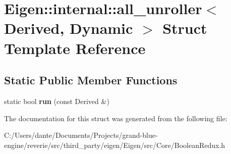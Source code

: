 \hypertarget{struct_eigen_1_1internal_1_1all__unroller_3_01_derived_00_01_dynamic_01_4}{}\section{Eigen\+::internal\+::all\+\_\+unroller$<$ Derived, Dynamic $>$ Struct Template Reference}
\label{struct_eigen_1_1internal_1_1all__unroller_3_01_derived_00_01_dynamic_01_4}
\subsection*{Static Public Member Functions}
\begin{DoxyCompactItemize}
\item 
\mbox{\label{struct_eigen_1_1internal_1_1all__unroller_3_01_derived_00_01_dynamic_01_4_aaa404402dee83da46a6081e31ca61ef4}} 
static bool {\bfseries run} (const Derived \&)
\end{DoxyCompactItemize}


The documentation for this struct was generated from the following file\+:\begin{DoxyCompactItemize}
\item 
C\+:/\+Users/dante/\+Documents/\+Projects/grand-\/blue-\/engine/reverie/src/third\+\_\+party/eigen/\+Eigen/src/\+Core/Boolean\+Redux.\+h\end{DoxyCompactItemize}
